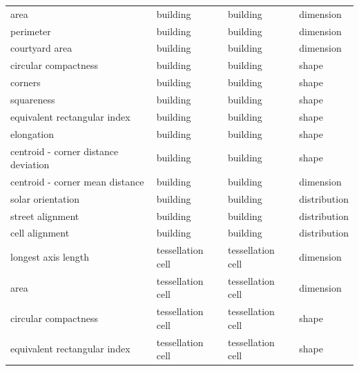 \begin{longtable}{p{5cm}p{4cm}p{4cm}l}
\bottomrule
\endlastfoot
                                area &                        building &                   building &    dimension \\
                            perimeter &                        building &                   building &    dimension \\
                        courtyard area &                        building &                   building &    dimension \\
                circular compactness &                        building &                   building &        shape \\
                                corners &                        building &                   building &        shape \\
                            squareness &                        building &                   building &        shape \\
        equivalent rectangular index &                        building &                   building &        shape \\
                            elongation &                        building &                   building &        shape \\
centroid - corner distance deviation &                        building &                   building &        shape \\
        centroid - corner mean distance &                        building &                   building &    dimension \\
                    solar orientation &                        building &                   building & distribution \\
                    street alignment &                        building &                   building & distribution \\
                        cell alignment &                        building &                   building & distribution \\
                    longest axis length &               tessellation cell &          tessellation cell &    dimension \\
                                area &               tessellation cell &          tessellation cell &    dimension \\
                circular compactness &               tessellation cell &          tessellation cell &        shape \\
        equivalent rectangular index &               tessellation cell &          tessellation cell &        shape \\

\end{longtable}
